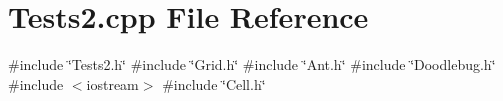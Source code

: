 \section{Tests2.\+cpp File Reference}
\label{Tests2_8cpp}
{\ttfamily \#include \char`\"{}Tests2.\+h\char`\"{}}\newline
{\ttfamily \#include \char`\"{}Grid.\+h\char`\"{}}\newline
{\ttfamily \#include \char`\"{}Ant.\+h\char`\"{}}\newline
{\ttfamily \#include \char`\"{}Doodlebug.\+h\char`\"{}}\newline
{\ttfamily \#include $<$iostream$>$}\newline
{\ttfamily \#include \char`\"{}Cell.\+h\char`\"{}}\newline
